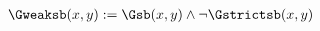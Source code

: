 \begin{erin}
    \begin{align*}
        \Gweaksb(x,y) := \Gsb(x,y) \wedge \neg\Gstrictsb(x,y)
    \end{align*}
\end{erin}
% 
%         
% 
%  
%         
% 
